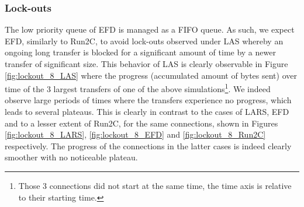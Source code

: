 \documentclass[preprint,12pt]{elsarticle}
\begin{document}

\subsubsection{Lock-outs}

The low priority queue of EFD is managed as a FIFO queue. As such, we expect EFD, similarly to Run2C, to avoid lock-outs observed under LAS whereby an ongoing long transfer is blocked for a significant amount of time by a newer transfer of significant size. This behavior of LAS is clearly observable in Figure \ref{fig:lockout_8_LAS} where the progress (accumulated amount of bytes sent) over time of the 3 largest transfers of one of the above simulations\footnote{Those 3 connections did not start at the same time, the time axis is relative to their starting time.}. We indeed observe large periods of times where the transfers experience no progress, which leads to several plateaus. This is clearly in contrast to the cases of LARS, EFD and to a lesser extent of Run2C, for the same connections, shown in  Figures \ref{fig:lockout_8_LARS}, \ref{fig:lockout_8_EFD} and  \ref{fig:lockout_8_Run2C}  respectively. The progress of the connections in the latter cases is indeed clearly smoother with no noticeable plateau. 
\end{document}
